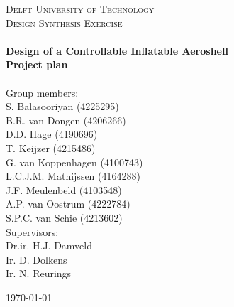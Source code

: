 \begin{titlepage}
\begin{center}

\textsc{\LARGE Delft University of Technology}\\[0.3cm]
\textsc{\Large Design Synthesis Exercise}\\[0.5cm]

\HRule \\[0.4cm]
{\Large \bfseries Design of a Controllable Inflatable Aeroshell}\\[0.2cm]
{\Huge \bfseries Project plan}\\[0.2cm]
\HRule \\[9cm]


Group members: \\[0.2cm]
S. Balasooriyan (4225295) \\
B.R. van Dongen (4206266) \\
D.D. Hage (4190696) \\
T. Keijzer (4215486) \\
G. van Koppenhagen (4100743) \\
L.C.J.M. Mathijssen (4164288) \\
J.F. Meulenbeld (4103548) \\
A.P. van Oostrum (4222784) \\
S.P.C. van Schie (4213602) \\[0.5cm]

Supervisors: \\[0.2cm]
Dr.ir. H.J. Damveld \\
Ir. D. Dolkens \\
Ir. N. Reurings \\



\vfill

\begin{large}\today \end{large}

\end{center}
\end{titlepage}